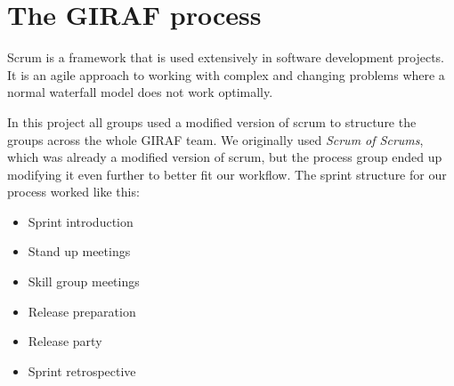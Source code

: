\section{The GIRAF process}\label{the-giraf-process}
Scrum is a framework that is used extensively in software development projects.
It is an agile approach to working with complex and changing problems where a normal waterfall model does not work optimally.

In this project all groups used a modified version of scrum to structure the groups across the whole GIRAF team.
We originally used \textit{Scrum of Scrums}, which was already a modified version of scrum, but the process group ended up modifying it even further to better fit our workflow.
The sprint structure for our process worked like this:

\begin{itemize}
    \item Sprint introduction
    \item Stand up meetings
    \item Skill group meetings
    \item Release preparation
    \item Release party
    \item Sprint retrospective
\end{itemize}

